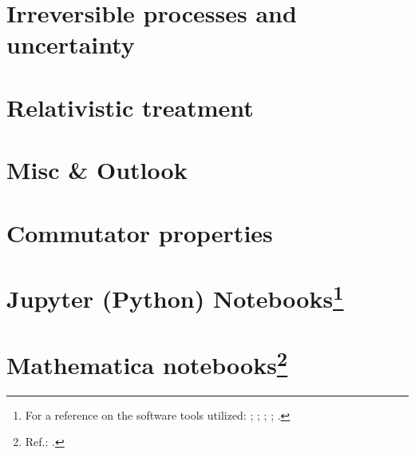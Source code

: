 \chapter{Irreversible processes and uncertainty}


\chapter{Relativistic treatment}


\fi

\chapter{Misc \& Outlook}

\fi

\appendix

\chapter{Commutator properties}


\chapter[Jupyter (Python) Notebooks]{Jupyter (Python) Notebooks\footnote{
  For a reference on the software tools utilized:
  \cite{comp:scipy};
  \cite{comp:sympy};
  \cite{comp:jupyter};
  \cite{comp:matplotlib};
  \cite{comp:numpy}.
}}




\chapter[Mathematica notebooks]{Mathematica notebooks\footnote{
  Ref.: \cite{Wolfram}.
}}



\printbibliography[heading=bibintoc]


